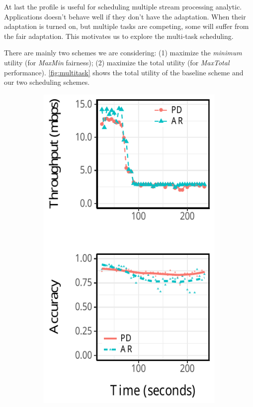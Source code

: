 At last the profile is useful for scheduling multiple stream processing
analytic. Applications doesn't behave well if they don't have the
adaptation. When their adaptation is turned on, but multiple tasks are
competing, some will suffer from the fair adaptation. This motivates us to
explore the multi-task scheduling.

There are mainly two schemes we are considering: (1) maximize the
\textit{minimum} utility (for \textit{MaxMin} fairness); (2) maximize the total
utility (for \textit{MaxTotal} performance). \autoref{fig:multitask} shows the
total utility of the baseline scheme and our two scheduling schemes.

\begin{figure}
  \centering
  \begin{subfigure}[t]{0.49\columnwidth}
    \centering
    \includegraphics[width=\textwidth]{figures/multitask-eq-bw.pdf}

\end{subfigure}
\end{figure}
